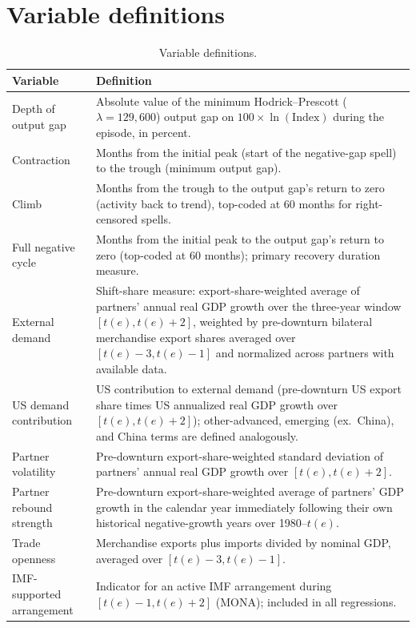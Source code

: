 \documentclass[12pt, a4paper]{article}
\renewcommand{\thesection}{\Roman{section}.}
\begin{document}
\clearpage
\appendix
\renewcommand{\thesection}{\Alph{section}.}

\section{Variable definitions}\label{app:vardef}

\begin{table}[H]
\centering\small
\renewcommand{\arraystretch}{0.92}
\caption{Variable definitions.}
\label{tab:vardef}
\begin{tabularx}{\textwidth}{@{}lX@{}}
\toprule
Variable & Definition \\ \midrule
Depth of output gap & Absolute value of the minimum Hodrick--Prescott ($\lambda=129{,}600$) output gap on $100\times \ln(\text{Index})$ during the episode, in percent. \\
Contraction & Months from the initial peak (start of the negative-gap spell) to the trough (minimum output gap). \\
Climb & Months from the trough to the output gap's return to zero (activity back to trend), top-coded at 60 months for right-censored spells. \\
Full negative cycle & Months from the initial peak to the output gap's return to zero (top-coded at 60 months); primary recovery duration measure. \\
External demand & Shift-share measure: export-share-weighted average of partners' annual real GDP growth over the three-year window $[t(e),t(e)+2]$, weighted by pre-downturn bilateral merchandise export shares averaged over $[t(e)-3,t(e)-1]$ and normalized across partners with available data. \\
US demand contribution & US contribution to external demand (pre-downturn US export share times US annualized real GDP growth over $[t(e),t(e)+2]$); other-advanced, emerging (ex.\ China), and China terms are defined analogously. \\
Partner volatility & Pre-downturn export-share-weighted standard deviation of partners' annual real GDP growth over $[t(e),t(e)+2]$. \\
Partner rebound strength & Pre-downturn export-share-weighted average of partners' GDP growth in the calendar year immediately following their own historical negative-growth years over 1980--$t(e)$. \\
Trade openness & Merchandise exports plus imports divided by nominal GDP, averaged over $[t(e)-3,t(e)-1]$. \\
IMF-supported arrangement & Indicator for an active IMF arrangement during $[t(e)-1,t(e)+2]$ (MONA); included in all regressions. \\

\end{tabularx}
\end{table}
\end{document}
